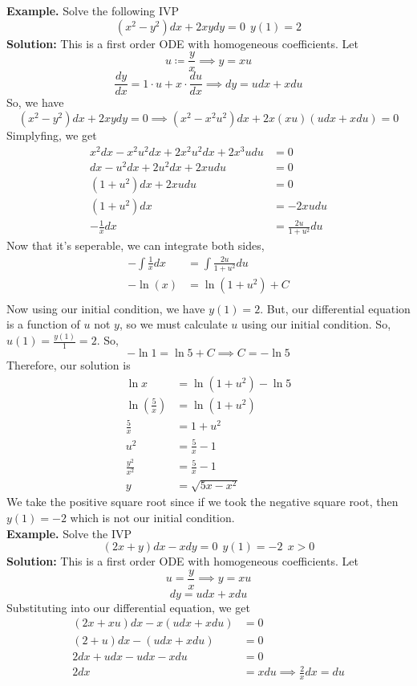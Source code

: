 \documentclass[openany]{report}
\begin{document}
\noindent
\textbf{Example.} Solve the following IVP 
\[(x^2-y^2)dx + 2xydy = 0 \ \ y(1) = 2\]
\textbf{Solution:} This is a first order ODE with homogeneous coefficients. Let 
\[u \coloneqq \frac{y}{x} \implies y = xu\]
\[\frac{dy}{dx} = 1 \cdot u + x \cdot \frac{du}{dx} \implies dy = udx + xdu\]
So, we have 
\[(x^2-y^2)dx + 2xydy = 0 \implies (x^2 - x^2u^2)dx + 2x(xu)(udx + xdu) = 0\]
Simplyfing, we get 
\begin{align*}
    x^2dx - x^2u^2dx + 2x^2u^2dx + 2x^3udu &= 0\\
    dx - u^2dx + 2u^2dx + 2xudu &= 0\\
    (1 + u^2)dx + 2xudu &= 0\\
    (1+u^2)dx &= -2xudu\\
    -\frac{1}{x}dx &= \frac{2u}{1+u^2}du
\end{align*}
Now that it's seperable, we can integrate both sides,
\begin{align*}
    -\int \frac{1}{x}dx &= \int \frac{2u}{1+u^2}du\\
    -\ln(x) &= \ln(1+u^2) + C\\
\end{align*}
Now using our initial condition, we have $y(1) = 2$. But, our differential equation is a function of $u$ not $y$, so we must calculate $u$ using our initial condition. So, $u(1) = \frac{y(1)}{1} = 2$. So, 
\[-\ln 1 = \ln 5 + C \implies C = -\ln 5\]
Therefore, our solution is
\begin{align*}
    \ln x &= \ln(1 + u^2) - \ln 5\\
    \ln\left(\frac{5}{x}\right) &= \ln(1 + u^2)\\
    \frac{5}{x} &= 1 + u^2\\
    u^2 &= \frac{5}{x} - 1\\
    \frac{y^2}{x^2} &= \frac{5}{x} - 1\\
    y &= \sqrt{5x - x^2}
\end{align*}
We take the positive square root since if we took the negative square root, then $y(1) = -2$ which is not our initial condition.\\[2ex]
\textbf{Example.} Solve the IVP 
\[(2x + y)dx - xdy = 0 \ \ y(1) = -2 \ \ x > 0\]
\textbf{Solution:} This is a first order ODE with homogeneous coefficients. Let
\[u = \frac{y}{x} \implies y = xu\]
\[dy = udx + xdu\]
Substituting into our differential equation, we get
\begin{align*}
    (2x + xu)dx - x(udx + xdu) &= 0\\
    (2+u)dx - (udx + xdu) &= 0\\  
    2dx + udx - udx - xdu &= 0\\
    2dx &= xdu \implies \frac{2}{x}dx = du
\end{align*}
\end{document}

